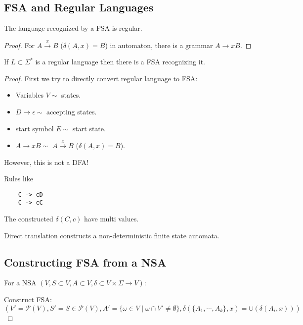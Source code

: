 \subsection{FSA and Regular Languages}

\begin{theorem}
The language recognized by a FSA is regular.
\end{theorem}

\begin{proof}
For \(A \overset{x}{\rightarrow} B\) (\(\delta(A,x)=B\)) in automaton,
there is a grammar \(A \rightarrow xB\).
\end{proof}

\begin{theorem}
If \(L \subset \Sigma^*\) is a regular language then
there is a FSA recognizing it.
\end{theorem}

\begin{proof}
First we try to directly convert regular language to FSA:
\begin{itemize}
    \item Variables $V \sim$ states.
    \item \(D \rightarrow \epsilon \sim\) accepting states.
    \item start symbol \(E\sim\) start state.
    \item \(A \rightarrow xB \sim\) \(A \overset{x}{\rightarrow} B\)
(\(\delta(A,x)=B\)).
\end{itemize}

However, this is not a DFA!
\begin{observation}
Rules like
\begin{verbatim}
    C -> cD
    C -> cC
\end{verbatim}
The constructed \(\delta(C,c)\) have multi values.
\end{observation}

Direct translation constructs a non-deterministic finite state automata.

\subsection{Constructing FSA from a NSA}

For a NSA
\((V, S \subset V, A \subset V, \delta \subset V \times \Sigma \rightarrow V)\):

Construct FSA:
\((V' = \mathcal{P}(V), S' = {S} \in \mathcal{P}(V), A' = \{\omega \in V \mid \omega \cap V' \ne \emptyset \}, \delta(\{A_1, \cdots, A_k\}, x) = \cup (\delta(A_i,x)))\)
\end{proof}


